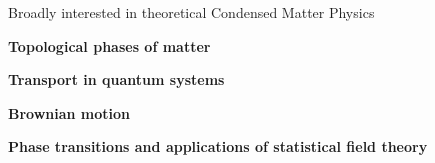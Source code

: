 

\begin{cventries}

  \cventry
    {} %
    {{Broadly interested in theoretical Condensed Matter Physics}} %
    {} %
    {} %
    {
      \begin{cvitems} %
        \item {\textbf{Topological phases of matter}}
        \item {\textbf{Transport in quantum systems}}
        \item {\textbf{Brownian motion}}
        \item {\textbf{Phase transitions and applications of statistical field theory}}
      \end{cvitems}
    }

\end{cventries}
